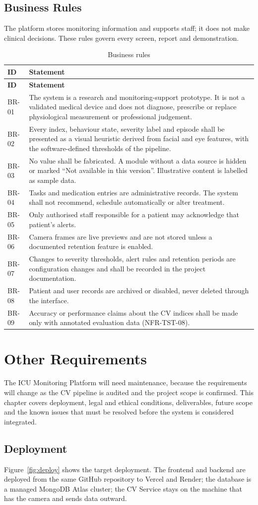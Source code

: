 \documentclass[a4paper,11pt]{scrreprt}
\makeatletter
\newenvironment{idtable}[1]{%
  \small
  \begin{longtable}{@{}>{\ttfamily\footnotesize}p{1.9cm}>{\raggedright\arraybackslash}p{13.2cm}@{}}
  \caption{#1}\\
  \toprule \textbf{ID} & \textbf{Statement}\\ \midrule
  \endfirsthead
  \toprule \textbf{ID} & \textbf{Statement}\\ \midrule
  \endhead
  \bottomrule
  \endfoot
}{%
  \end{longtable}\normalsize
}
\newcommand{\idr}[2]{#1 & #2 \\ \midrule}
\makeatother
\begin{document}
\section{Business Rules}
The platform stores monitoring information and supports staff; it does not make clinical decisions. These rules govern every screen, report and demonstration.
\begin{idtable}{Business rules}
\idr{BR-01}{The system is a research and monitoring-support prototype. It is not a validated medical device and does not diagnose, prescribe or replace physiological measurement or professional judgement.}
\idr{BR-02}{Every index, behaviour state, severity label and episode shall be presented as a visual heuristic derived from facial and eye features, with the software-defined thresholds of the pipeline.}
\idr{BR-03}{No value shall be fabricated. A module without a data source is hidden or marked ``Not available in this version''. Illustrative content is labelled as sample data.}
\idr{BR-04}{Tasks and medication entries are administrative records. The system shall not recommend, schedule automatically or alter treatment.}
\idr{BR-05}{Only authorised staff responsible for a patient may acknowledge that patient's alerts.}
\idr{BR-06}{Camera frames are live previews and are not stored unless a documented retention feature is enabled.}
\idr{BR-07}{Changes to severity thresholds, alert rules and retention periods are configuration changes and shall be recorded in the project documentation.}
\idr{BR-08}{Patient and user records are archived or disabled, never deleted through the interface.}
\idr{BR-09}{Accuracy or performance claims about the CV indices shall be made only with annotated evaluation data (NFR-TST-08).}
\end{idtable}

\chapter{Other Requirements}
The ICU Monitoring Platform will need maintenance, because the requirements will change as the CV pipeline is audited and the project scope is confirmed. This chapter covers deployment, legal and ethical conditions, deliverables, future scope and the known issues that must be resolved before the system is considered integrated.

\section{Deployment}
Figure~\ref{fig:deploy} shows the target deployment. The frontend and backend are deployed from the same GitHub repository to Vercel and Render; the database is a managed MongoDB Atlas cluster; the CV Service stays on the machine that has the camera and sends data outward.
\end{document}
